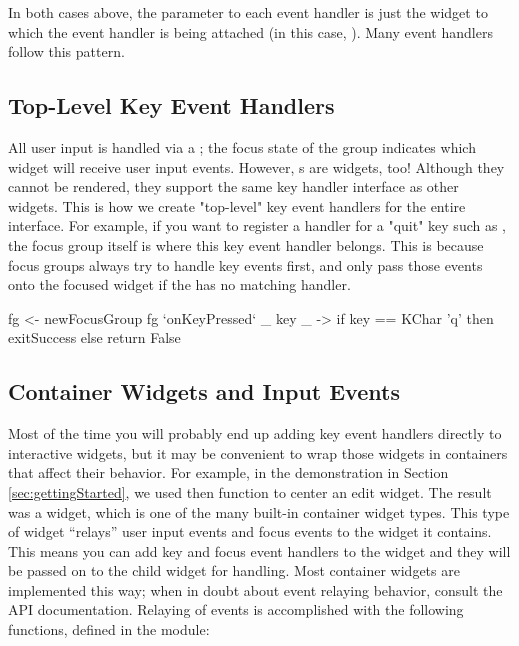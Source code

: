 In both cases above, the  parameter to each event handler is
just the widget to which the event handler is being attached (in this
case, ).  Many event handlers follow this pattern.

\subsection{Top-Level Key Event Handlers}

All user input is handled via a ; the focus state of
the group indicates which widget will receive user input events.
However, s are widgets, too!  Although they cannot be
rendered, they support the same key handler interface as other
widgets.  This is how we create "top-level" key event handlers for the
entire interface.  For example, if you want to register a handler for
a "quit" key such as , the focus group itself is where this
key event handler belongs.  This is because focus groups always try to
handle key events first, and only pass those events onto the focused
widget if the  has no matching handler.

\begin{haskellcode}
 fg <- newFocusGroup
 fg `onKeyPressed` \_ key _ ->
   if key == KChar 'q' then
     exitSuccess else return False
\end{haskellcode}

\subsection{Container Widgets and Input Events}
\label{sec:containers_and_input}

Most of the time you will probably end up adding key event handlers
directly to interactive widgets, but it may be convenient to wrap
those widgets in containers that affect their behavior.  For example,
in the demonstration in Section \ref{sec:gettingStarted}, we used then
 function to center an edit widget.  The result was a
 widget, which is one of the many built-in container
widget types.  This type of widget ``relays'' user input events and
focus events to the widget it contains.  This means you can add key
and focus event handlers to the  widget and they will be
passed on to the child widget for handling.  Most container widgets
are implemented this way; when in doubt about event relaying behavior,
consult the API documentation.  Relaying of events is accomplished
with the following functions, defined in the  module:

